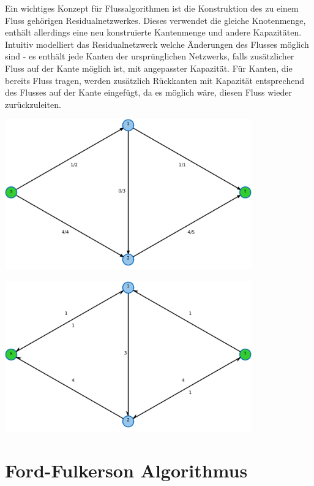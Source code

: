 Ein wichtiges Konzept für Flussalgorithmen ist die Konstruktion des zu einem Fluss gehörigen Residualnetzwerkes. Dieses verwendet die gleiche Knotenmenge, enthält allerdings eine neu konstruierte Kantenmenge und andere Kapazitäten. Intuitiv modelliert das Residualnetzwerk welche Änderungen des Flusses möglich sind - es enthält jede Kanten der ursprünglichen Netzwerks, falls zusätzlicher Fluss auf der Kante möglich ist, mit angepasster Kapazität. Für Kanten, die bereits Fluss tragen, werden zusätzlich Rückkanten mit Kapazität entsprechend des Flusses auf der Kante eingefügt, da es möglich wäre, diesen Fluss wieder zurückzuleiten.

\vspace{0.5cm}
\begin{minipage}[t]{0.99\textwidth}
    \includegraphics[width=0.8\textwidth]{img/network.pdf}
\end{minipage}
\begin{minipage}[t]{0.99\textwidth}
    \includegraphics[width=0.8\textwidth]{img/network-residual.pdf}
\end{minipage}

\section{Ford-Fulkerson Algorithmus}

